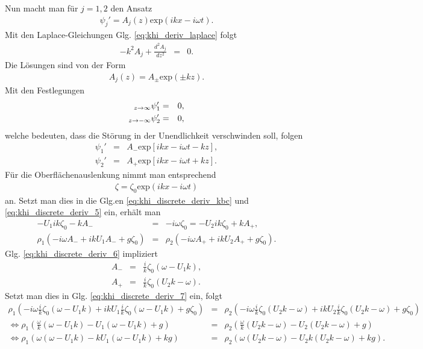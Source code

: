 \documentclass{book}
\renewcommand{\exp}{\text{exp}}
\let\lim\relax
\DeclareMathOperator*{\lim}{\text{lim}}
\begin{document}
%
Nun macht man für $j = 1, 2$ den Ansatz
%
\begin{eqnarray}
\psi_j' = A_j\left(z\right)\exp\left(ikx - i\omega t\right).
\end{eqnarray}
%
Mit den Laplace-Gleichungen Glg. \eqref{eq:khi_deriv_laplace} folgt
%
\begin{eqnarray}
-k^2A_j + \frac{d^2A_j}{dz^2} & = & 0.
\end{eqnarray}
%
Die Lösungen sind von der Form
%
\begin{eqnarray}
A_j\left(z\right) = A_\pm\exp\left(\pm kz\right).
\end{eqnarray}
%
Mit den Festlegungen
%
\begin{eqnarray}
\lim_{z \to\infty} \psi_1' & = & 0,\\
\lim_{z \to -\infty} \psi_2' & = & 0,
\end{eqnarray}
%
welche bedeuten, dass die Störung in der Unendlichkeit verschwinden soll, folgen
%
\begin{eqnarray}
\psi_1' & = & A_-\exp\left[ikx - i\omega t - kz\right],\\
\psi_2' & = & A_+\exp\left[ikx - i\omega t + kz\right].
\end{eqnarray}
%
Für die Oberflächenauslenkung nimmt man entsprechend
%
\begin{eqnarray}
\zeta = \zeta_0\exp\left(ikx - i\omega t\right)
\end{eqnarray}
%
an. Setzt man dies in die Glg.en \eqref{eq:khi_discrete_deriv_kbc} und \eqref{eq:khi_discrete_deriv_5} ein, erhält man
%
\begin{eqnarray}
-U_1ik\zeta_0 - kA_- & = & -i\omega\zeta_0 = -U_2ik\zeta_0 + kA_+,\label{eq:khi_discrete_deriv_6}\\
\rho_1\left(-i\omega A_- + ikU_1A_- + g\zeta_0\right) & = & \rho_2\left(-i\omega A_+ + ikU_2A_+ + g\zeta_0\right).\label{eq:khi_discrete_deriv_7}
\end{eqnarray}
%
Glg. \eqref{eq:khi_discrete_deriv_6} impliziert
%
\begin{eqnarray}
A_- & = & \frac{i}{k}\zeta_0\left(\omega - U_1k\right),\\
A_+ & = & \frac{i}{k}\zeta_0\left(U_2k - \omega\right).
\end{eqnarray}
%
Setzt man dies in Glg. \eqref{eq:khi_discrete_deriv_7} ein, folgt
%
\begin{eqnarray}
\rho_1\left(-i\omega\frac{i}{k}\zeta_0\left(\omega - U_1k\right) + ikU_1\frac{i}{k}\zeta_0\left(\omega - U_1k\right) + g\zeta_0\right) & = & \rho_2\left(-i\omega\frac{i}{k}\zeta_0\left(U_2k - \omega\right) + ikU_2\frac{i}{k}\zeta_0\left(U_2k - \omega\right) + g\zeta_0\right)\nonumber\\
\Leftrightarrow\rho_1\left(\frac{\omega}{k}\left(\omega - U_1k\right) - U_1\left(\omega - U_1k\right) + g\right) & = & \rho_2\left(\frac{\omega}{k}\left(U_2k - \omega\right) - U_2\left(U_2k - \omega\right) + g\right)\nonumber\\
\Leftrightarrow\rho_1\left(\omega\left(\omega - U_1k\right) - kU_1\left(\omega - U_1k\right) + kg\right) & = & \rho_2\left(\omega\left(U_2k - \omega\right) - U_2k\left(U_2k - \omega\right) + kg\right).
\end{eqnarray}
\end{document}
